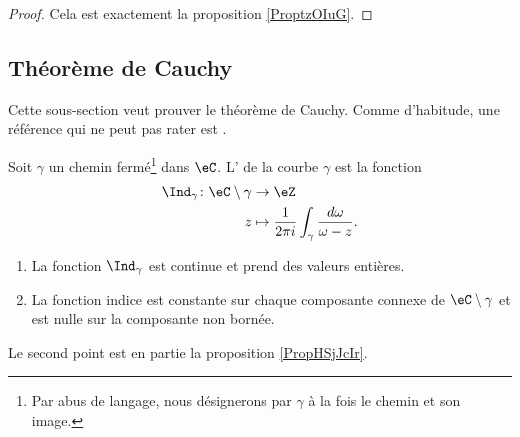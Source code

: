 \begin{proof}
    Cela est exactement la proposition \ref{ProptzOIuG}.
\end{proof}

\subsection{Théorème de Cauchy}

Cette sous-section veut prouver le théorème de Cauchy. Comme d'habitude, une référence qui ne peut pas rater est \cite{Holomorphieus}.

\begin{definition}
    Soit \( \gamma\) un chemin fermé\footnote{Par abus de langage, nous désignerons par \( \gamma\) à la fois le chemin et son image.} dans \( \eC\). L' de la courbe \( \gamma\) est la fonction
    \begin{equation}
        \begin{aligned}
            \Ind_{\gamma}\colon \eC\setminus \gamma&\to \eZ \\
            z&\mapsto \frac{1}{ 2\pi i }\int_{\gamma}\frac{ d\omega }{ \omega-z }. 
        \end{aligned}
    \end{equation}
\end{definition}

\begin{theorem}     \label{ThoDYQQXZ}
    \begin{enumerate}
        \item
            La fonction \( \Ind_{\gamma}\) est continue et prend des valeurs entières.
        \item
            La fonction indice est constante sur chaque composante connexe de \( \eC\setminus \gamma\) et est nulle sur la composante non bornée.
    \end{enumerate}
\end{theorem}
Le second point est en partie la proposition \ref{PropHSjJcIr}.


